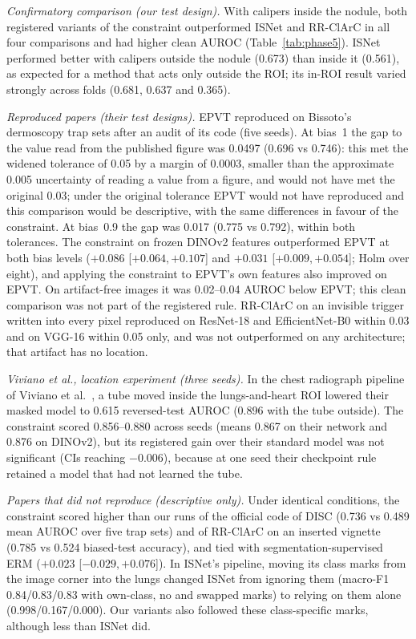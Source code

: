\documentclass[12pt]{article}
\begin{document}
\emph{Confirmatory comparison (our test design).} With calipers inside the nodule, both registered variants of the
constraint outperformed ISNet and RR-ClArC in all four comparisons and had higher clean AUROC (Table~\ref{tab:phase5}).
ISNet performed better with calipers outside the nodule (0.673) than inside it (0.561), as expected for a method that acts
only outside the ROI; its in-ROI result varied strongly across folds (0.681, 0.637 and 0.365).

\emph{Reproduced papers (their test designs).} EPVT \cite{yan2023epvt} reproduced on Bissoto's dermoscopy trap sets
\cite{bissoto2022artifact} after an audit of its code (five seeds). At bias~1 the gap to the value read from the published
figure was 0.0497 (0.696 vs 0.746): this met the widened tolerance of 0.05 by a margin of 0.0003, smaller than the
approximate 0.005 uncertainty of reading a value from a figure, and would not have met the original 0.03; under the original tolerance EPVT would not have reproduced and
this comparison would be descriptive, with the same differences in favour of the constraint. At bias~0.9 the
gap was 0.017 (0.775 vs 0.792), within both tolerances. The constraint on frozen DINOv2 features outperformed EPVT at both
bias levels ($+0.086$ [$+0.064, +0.107$] and $+0.031$ [$+0.009, +0.054$]; Holm over eight), and applying the constraint to
EPVT's own features also improved on EPVT. On artifact-free images it was 0.02--0.04 AUROC below EPVT; this clean
comparison was not part of the registered rule. RR-ClArC on an invisible trigger written into every pixel
\cite{dreyer2024hope} reproduced on ResNet-18 and EfficientNet-B0 within 0.03 and on VGG-16 within 0.05 only, and was not
outperformed on any architecture; that artifact has no location.

\emph{Viviano et al., location experiment (three seeds).} In the chest radiograph pipeline of Viviano et
al.~\cite{viviano2021saliency}, a tube moved inside the lungs-and-heart ROI lowered their masked model to 0.615
reversed-test AUROC (0.896 with the tube outside). The constraint scored 0.856--0.880 across seeds (means 0.867 on their
network and 0.876 on DINOv2), but its registered gain over their standard model was not significant (CIs reaching
$-0.006$), because at one seed their checkpoint rule retained a model that had not learned the tube.

\emph{Papers that did not reproduce (descriptive only).} Under identical conditions, the constraint scored higher than our
runs of the official code of DISC \cite{wu2023disc} (0.736 vs 0.489 mean AUROC over five trap sets) and of RR-ClArC on an
inserted vignette \cite{pahde2025ensuring} (0.785 vs 0.524 biased-test accuracy), and tied with segmentation-supervised ERM
\cite{saab2022spatial} ($+0.023$ [$-0.029, +0.076$]). In ISNet's pipeline, moving its class marks from the image corner
into the lungs changed ISNet from ignoring them (macro-F1 0.84/0.83/0.83 with own-class, no and swapped marks) to relying
on them alone (0.998/0.167/0.000). Our variants also followed these class-specific marks, although less than ISNet did.
\end{document}
